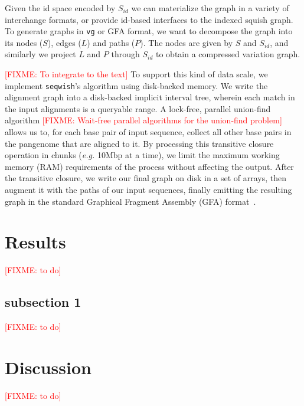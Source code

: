 \documentclass{bioinfo}
\theoremstyle{definition}
\newcommand{\red}[1]{{\textcolor{Red}{#1}}}
\newcommand{\FIXME}[1]{\red{[FIXME: #1]}}
\begin{document}
    Given the id space encoded by $S_{id}$ we can materialize the graph in a variety of interchange formats, or provide id-based interfaces to the indexed squish graph.
    To generate graphs in \texttt {vg} or GFA format, we want to decompose the graph into its nodes ($S$), edges ($L$) and paths ($P$).
    The nodes are given by $S$ and $S_{id}$, and similarly we project $L$ and $P$ through $S_{id}$ to obtain a compressed variation graph.

    \FIXME{To integrate to the text}
    To support this kind of data scale, we implement \texttt{seqwish}'s algorithm using disk-backed memory.
    We write the alignment graph into a disk-backed implicit interval tree, wherein each match in the input alignments is a queryable range.
    A lock-free, parallel union-find algorithm \FIXME{Wait-free parallel algorithms for the union-find problem} allows us to, for each base pair of input sequence, collect all other base pairs in the pangenome that are aligned to it.
    By processing this transitive closure operation in chunks (\textit{e.g.} 10Mbp at a time), we limit the maximum working memory (RAM) requirements of the process without affecting the output.
    After the transitive closure, we write our final graph on disk in a set of arrays, then augment it with the paths of our input sequences,
    finally emitting the resulting graph in the standard Graphical Fragment Assembly (GFA) format~\citep{GFA}.


    \section{Results}
    \label{sec:results}
    \FIXME{to do}


    \subsection{subsection 1}
    \label{subsec:subsec1}
    \FIXME{to do}


    \section{Discussion}
    \label{sec:discussion}
    \FIXME{to do}
\end{document}
